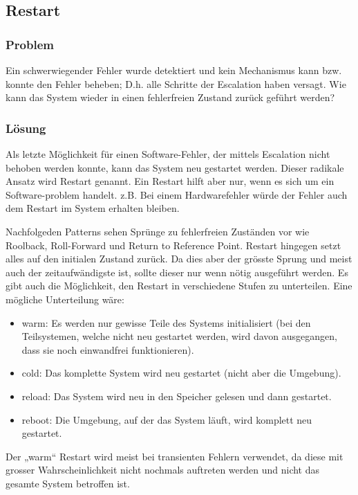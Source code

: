 \subsection{Restart}


\subsubsection*{Problem}


Ein schwerwiegender Fehler wurde detektiert und kein Mechanismus kann bzw. konnte den Fehler beheben; D.h. alle Schritte der Escalation haben versagt. Wie kann das System wieder in einen fehlerfreien Zustand zurück geführt werden?

\subsubsection*{Lösung}


Als letzte Möglichkeit für einen Software-Fehler, der mittels Escalation nicht behoben werden konnte, kann das System neu gestartet werden. Dieser radikale Ansatz wird Restart genannt. Ein Restart hilft aber nur, wenn es sich um ein Software-problem handelt. z.B. Bei einem Hardwarefehler würde der Fehler auch dem Restart im System erhalten bleiben.

Nachfolgeden Patterns sehen Sprünge zu fehlerfreien Zuständen vor wie Roolback, Roll-Forward  und Return to Reference Point. Restart hingegen setzt alles auf den initialen Zustand zurück. Da dies aber der grösste Sprung und meist auch der zeitaufwändigste ist, sollte dieser nur wenn nötig ausgeführt werden. Es gibt auch die Möglichkeit, den Restart in verschiedene Stufen zu unterteilen. Eine mögliche Unterteilung wäre:

\begin{itemize}
	\item warm: Es werden nur gewisse Teile des Systems initialisiert (bei den Teilsystemen, welche nicht neu gestartet werden, wird davon ausgegangen, dass sie noch einwandfrei funktionieren).
	\item cold: Das komplette System wird neu gestartet (nicht aber die Umgebung).
	\item reload: Das System wird neu in den Speicher gelesen und dann gestartet.
	\item reboot: Die Umgebung, auf der das System läuft, wird komplett neu gestartet.
\end{itemize}

Der „warm“ Restart wird meist bei transienten Fehlern verwendet, da diese mit grosser Wahrscheinlichkeit nicht nochmals auftreten werden und nicht das gesamte System betroffen ist.


